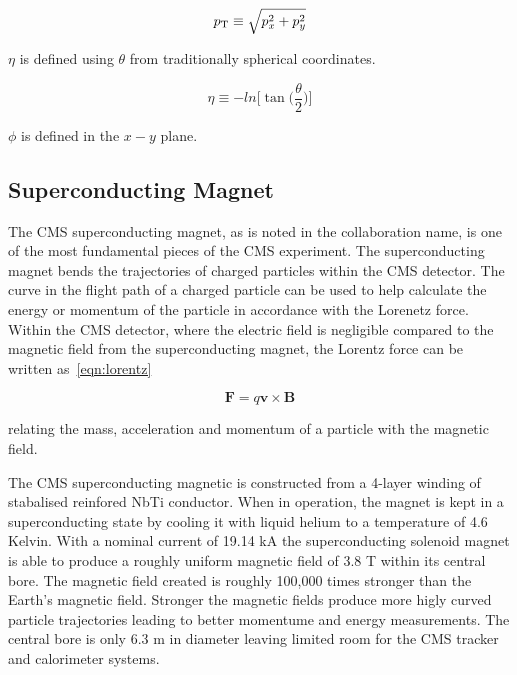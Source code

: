 \begin{equation}
p_\mathrm{T} \equiv \sqrt{p^{2}_{x} + p^{2}_{y}}
\end{equation}

$\eta$ is defined using $\theta$ from traditionally spherical coordinates.

\begin{equation}
\eta \equiv -ln\bigg[\tan\bigg(\frac{\theta}{2}\bigg)\bigg]
\end{equation}

$\phi$ is defined in the $x-y$ plane.



\subsection{Superconducting Magnet}
The CMS superconducting magnet, as is noted in the collaboration name, is one of the most fundamental
pieces of the CMS experiment. The superconducting magnet bends the trajectories of charged particles
within the CMS detector. The curve in the flight path of a charged particle can be used to help
calculate the energy or momentum of the particle in accordance with the Lorenetz force.
Within the CMS detector, where the electric field is negligible compared to the magnetic field
from the superconducting magnet, the Lorentz force can be written as~\ref{eqn:lorentz}

\begin{equation}
\textbf{F} = q\textbf{v} \times \textbf{B}
\label{eqn:lorentz}
\end{equation}

relating the mass, acceleration and momentum of a particle with the magnetic field.

The CMS superconducting magnetic is constructed from a 4-layer winding of stabalised
reinfored NbTi conductor. When in operation, the magnet is kept in a superconducting state
by cooling it with liquid helium to a temperature of 4.6 Kelvin. With a nominal current
of 19.14 kA the superconducting solenoid magnet is able to produce a roughly uniform
magnetic field of 3.8 T within its central bore. The magnetic field created is roughly
100,000 times stronger than the Earth's magnetic field. Stronger the magnetic fields produce
more higly curved particle trajectories leading to better momentume and energy measurements.
The central bore is only 6.3 m in diameter
leaving limited room for the CMS tracker and calorimeter systems.




